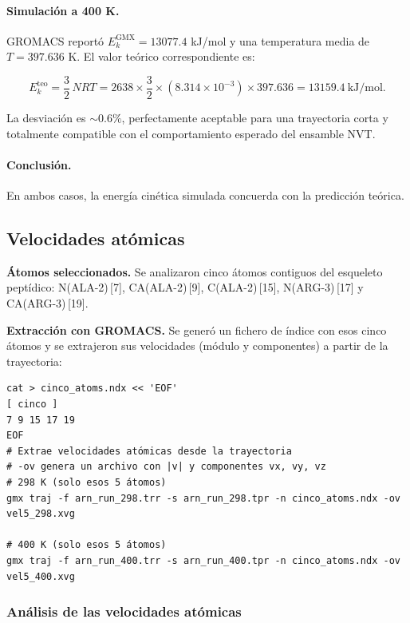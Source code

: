\documentclass[12pt,a4paper]{article}
\begin{document}
\paragraph{Simulación a 400 K.}
GROMACS reportó $E_k^{\mathrm{GMX}} = 13077.4$ kJ/mol y una temperatura media de
$T = 397.636$ K. El valor teórico correspondiente es:

\begin{equation}
E_k^{\mathrm{teo}} = \frac{3}{2} \, N R T
= 2638 \times \frac{3}{2} \times (8.314\times 10^{-3}) \times 397.636
= 13159.4\ \text{kJ/mol}.
\end{equation}

La desviación es $\sim 0.6\%$, perfectamente aceptable para una trayectoria corta
y totalmente compatible con el comportamiento esperado del ensamble NVT.

\paragraph{Conclusión.}
En ambos casos, la energía cinética simulada concuerda con la predicción teórica.

\subsection{Velocidades atómicas}

\noindent\textbf{Átomos seleccionados.}
Se analizaron cinco átomos contiguos del esqueleto peptídico:
N(ALA-2)\,[7], CA(ALA-2)\,[9], C(ALA-2)\,[15], N(ARG-3)\,[17] y CA(ARG-3)\,[19].

\noindent\textbf{Extracción con GROMACS.}
Se generó un fichero de índice con esos cinco átomos y se extrajeron sus
velocidades (módulo y componentes) a partir de la trayectoria:

\begin{lstlisting}[style=bashstyle]
cat > cinco_atoms.ndx << 'EOF'
[ cinco ]
7 9 15 17 19
EOF
# Extrae velocidades atómicas desde la trayectoria
# -ov genera un archivo con |v| y componentes vx, vy, vz
# 298 K (solo esos 5 átomos)
gmx traj -f arn_run_298.trr -s arn_run_298.tpr -n cinco_atoms.ndx -ov vel5_298.xvg

# 400 K (solo esos 5 átomos)
gmx traj -f arn_run_400.trr -s arn_run_400.tpr -n cinco_atoms.ndx -ov vel5_400.xvg
\end{lstlisting}

\subsubsection*{Análisis de las velocidades atómicas}
\end{document}

